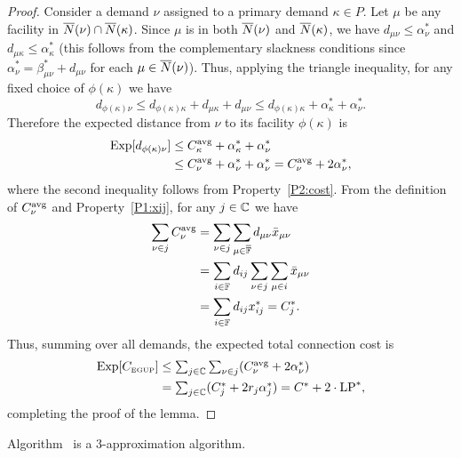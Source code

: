 \documentclass[11pt]{article}
\begin{document}
\begin{proof}
  Consider a demand $\nu$ assigned to a primary demand
  $\kappa\in P$. Let $\mu$ be any facility in ${\overline{N}}(\nu)
  \cap {\overline{N}}(\kappa)$.  Since $\mu$ is in both
  ${\overline{N}}(\nu)$ and ${\overline{N}}(\kappa)$, we have $d_{\mu\nu}
  \leq \alpha_{\nu}^\ast$ and $d_{\mu\kappa} \leq
  \alpha_{\kappa}^\ast$ (this follows from the complementary
  slackness conditions since
  $\alpha_{\nu}^\ast=\beta_{\mu\nu}^\ast + d_{\mu\nu}$ for
  each $\mu\in {\overline{N}}(\nu)$). Thus, applying the triangle inequality, for any fixed choice of
  $\phi(\kappa)$ we have
%
\begin{equation*}
    d_{\phi(\kappa)\nu} \leq d_{\phi(\kappa)\kappa}+d_{\mu\kappa}+d_{\mu\nu}
    \leq d_{\phi(\kappa)\kappa} + \alpha_{\kappa}^\ast + \alpha_{\nu}^\ast.
\end{equation*}
%
Therefore the expected distance from $\nu$ to its facility $\phi(\kappa)$ is 
%
\begin{align*}
  \mbox{\rm Exp}[  d_{\phi(\kappa)\nu}   ] &\le C^{{\mbox{\scriptsize\rm avg}}}_{\kappa} + \alpha_{\kappa}^\ast + \alpha_{\nu}^\ast 
\\
  &\leq C^{{\mbox{\scriptsize\rm avg}}}_{\nu} + \alpha_{\nu}^\ast + \alpha_{\nu}^\ast
   = C^{{\mbox{\scriptsize\rm avg}}}_{\nu} + 2\alpha_{\nu}^\ast,
  \end{align*}
%
  where the second inequality follows from Property~\ref{P2:cost}.  
From the definition of $C^{{\mbox{\scriptsize\rm avg}}}_{\nu}$ and Property~\ref{P1:xij}, for any $j\in \mathbb{C}$ 
we have
%
\begin{align*}
\sum_{\nu\in j} C^{{\mbox{\scriptsize\rm avg}}}_{\nu} &= \sum_{\nu\in j}\sum_{\mu\in\overline{\mathbb{F}}}d_{\mu\nu}{\bar x}_{\mu\nu}
			\\
 			&= \sum_{i\in\mathbb{F}} d_{ij}\sum_{\nu\in j}\sum_{\mu\in i}{\bar x}_{\mu\nu}
			\\
			&= \sum_{i\in\mathbb{F}} d_{ij}x^\ast_{ij} 
			= C^\ast_j.
\end{align*}
% 
Thus, summing over all demands, the expected total connection cost is
%
\begin{align*}
    \mbox{\rm Exp}[C_{\mbox{\tiny\rm EGUP}}] &\le 
			\textstyle{\sum_{j\in\mathbb{C}} \sum_{\nu\in j}} (C^{{\mbox{\scriptsize\rm avg}}}_{\nu} + 2\alpha_{\nu}^\ast) 
			\\
    	& = \textstyle{\sum_{j\in\mathbb{C}}} (C_j^\ast + 2r_j\alpha_j^\ast)
 		= C^\ast + 2\cdot\mbox{\rm LP}^\ast,
\end{align*}
%
completing the proof of the lemma.
\end{proof}


\begin{theorem}
Algorithm~{\EGUP} is a $3$-approximation algorithm.
\end{theorem}
\end{document}
